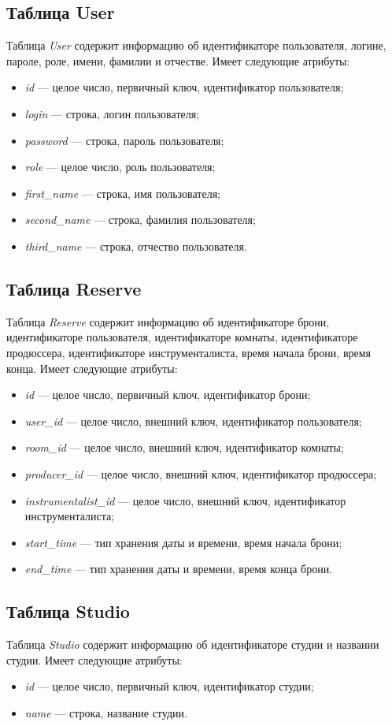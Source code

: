 \subsection{Таблица User}
Таблица \textit{User} содержит информацию об идентификаторе пользователя, логине, пароле, роле, имени, фамилии и отчестве.
Имеет следующие атрибуты:
\begin{itemize}
	\item \textit{id} --- целое число, первичный ключ, идентификатор пользователя;
	\item \textit{login} --- строка, логин пользователя;
	\item \textit{password} --- строка, пароль пользователя;
	\item \textit{role} --- целое число, роль пользователя;
	\item \textit{first\_name} --- строка, имя пользователя;
	\item \textit{second\_name} --- строка, фамилия пользователя;
	\item \textit{third\_name} --- строка, отчество пользователя.
\end{itemize}
\subsection{Таблица Reserve}
Таблица \textit{Reserve} содержит информацию об идентификаторе брони, идентификаторе пользователя, идентификаторе комнаты, идентификаторе продюссера, идентификаторе инструменталиста, время начала брони, время конца.
Имеет следующие атрибуты:
\begin{itemize}
	\item \textit{id} --- целое число, первичный ключ, идентификатор брони;
	\item \textit{user\_id} --- целое число, внешний ключ, идентификатор пользователя;
	\item \textit{room\_id} --- целое число, внешний ключ, идентификатор комнаты;
	\item \textit{producer\_id} --- целое число, внешний ключ, идентификатор продюссера;
	\item \textit{instrumentalist\_id} --- целое число, внешний ключ, идентификатор инструменталиста;
	\item \textit{start\_time} --- тип хранения даты и времени, время начала брони;
	\item \textit{end\_time} --- тип хранения даты и времени, время конца брони.
\end{itemize}
\subsection{Таблица Studio}
Таблица \textit{Studio} содержит информацию об идентификаторе студии и названии студии.
Имеет следующие атрибуты:
\begin{itemize}
	\item \textit{id} --- целое число, первичный ключ, идентификатор студии;
	\item \textit{name} --- строка, название студии.
\end{itemize}
